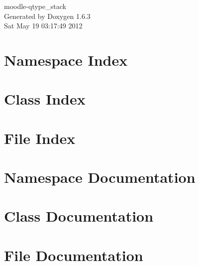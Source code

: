 \documentclass[a4paper]{book}
\begin{document}
\hypersetup{pageanchor=false}
\begin{titlepage}
\vspace*{7cm}
\begin{center}
{\Large moodle-\/qtype\_\-stack }\\
\vspace*{1cm}
{\large Generated by Doxygen 1.6.3}\\
\vspace*{0.5cm}
{\small Sat May 19 03:17:49 2012}\\
\end{center}
\end{titlepage}
\clearemptydoublepage
{}
\tableofcontents
\clearemptydoublepage
{}
\hypersetup{pageanchor=true}
\chapter{Namespace Index}

\chapter{Class Index}

\chapter{File Index}

\chapter{Namespace Documentation}

\chapter{Class Documentation}






\chapter{File Documentation}


















\printindex
\end{document}
